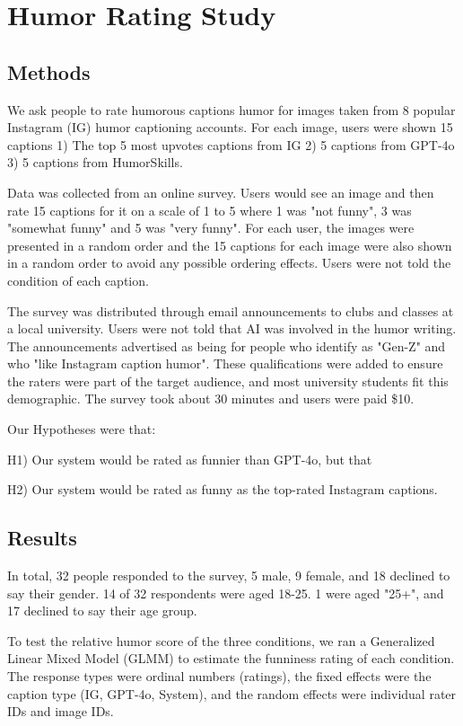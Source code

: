 

\section{Humor Rating Study}
\subsection{Methods}
We ask people to rate humorous captions humor for images taken from 8 popular Instagram (IG) humor captioning accounts. For each image, users were shown 15 captions
1) The top 5 most upvotes captions from IG
2) 5 captions from GPT-4o
3) 5 captions from HumorSkills. 

Data was collected from an online survey. Users would see an image and then rate 15 captions for it on a scale of 1 to 5 where 1 was "not funny", 3 was "somewhat funny" and 5 was "very funny". For each user, the images were presented in a random order and the 15 captions for each image were also shown in a random order to avoid any possible ordering effects. Users were not told the condition of each caption. 

The survey was distributed through email announcements to clubs and classes at a local university. Users were not told that AI was involved in the humor writing. The announcements advertised as being for people who identify as "Gen-Z" and who "like Instagram caption humor". These qualifications were added to ensure the raters were part of the target audience, and most university students fit this demographic.  The survey took about 30 minutes and users were paid \$10.

Our Hypotheses were that:

H1) Our system would be rated as funnier than GPT-4o, but that 

H2) Our system would be rated as funny as the top-rated Instagram captions.

\subsection{Results}
In total, 32 people responded to the survey, 5 male, 9 female, and 18 declined to say their gender. 14 of 32 respondents were aged 18-25. 1 were aged "25+", and 17 declined to say their age group.

To test the relative humor score of the three conditions, we ran a Generalized Linear Mixed Model (GLMM) to estimate the funniness rating of each condition. The response types were ordinal numbers (ratings), the fixed effects were the caption type (IG, GPT-4o, System), and the random effects were individual rater IDs and image IDs.

